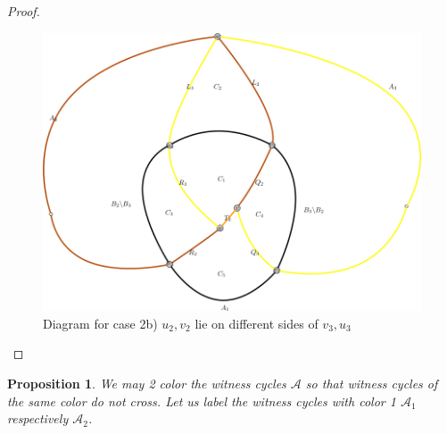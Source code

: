 \documentclass[letterpaper,11pt]{article}
\newtheorem{theorem}{Theorem}[section]
\newtheorem{prop}[theorem]{Proposition}
\newcommand{\0}{\mathbb{0}}
\newcommand{\1}{\mathbb{1}}
\begin{document}
\begin{proof}
   \begin{figure} 
   \begin{center}
   \includegraphics[scale=0.3]{cross2.png} 
      \end{center}
\caption{Diagram for case 2b)    $u_2, v_2$ lie on different sides of $v_3, u_3 $  }
\end{figure}

\end{proof} 


\begin{prop}
We may 2 color the witness cycles $\mathcal{A}$ so that witness cycles of the same color do not cross.  Let us label the witness cycles with color 1 $\mathcal{A}_1$  respectively  $\mathcal{A}_2$.
\end{prop} 
\end{document}
